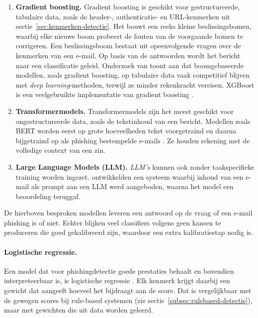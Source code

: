 \begin{enumerate}
    \item \textbf{Gradient boosting.} Gradient boosting is geschikt voor gestructureerde, tabulaire data, zoals de header-, authenticatie- en URL-ken\-merken uit sectie~\ref{sec:kenmerken-detectie}. Het bouwt een reeks kleine beslissingsbomen, waarbij elke nieuwe boom probeert de fouten van de voorgaande bomen te corrigeren. Een beslissingsboom bestaat uit opeenvolgende vragen over de kenmerken van een e-mail. Op basis van de antwoorden wordt het bericht naar een classificatie geleid. Onderzoek van \textcite{Grinsztajn2022} toont aan dat boomgebaseerde modellen, zoals gradient boosting, op tabulaire data vaak competitief blijven met \emph{deep learning}-methoden, terwijl ze minder rekenkracht vereisen. XGBoost is een veelgebruikte implementatie van gradient boosting \autocite{Chen2016}.
    \item \textbf{Transformermodels.} Transformermodels zijn het meest geschikt voor ongestructureerde data, zoals de tekstinhoud van een bericht. Modellen zoals BERT worden eerst op grote hoeveelheden tekst voorgetraind en daarna bijgetraind op als phishing bestempelde e-mails \autocite{Devlin2019}. Ze houden rekening met de volledige context van een zin.
    \item \textbf{Large Language Models (LLM).} \emph{LLM's} kunnen ook zonder taakspecifieke training worden ingezet. \textcite{Koide2025} ontwikkelden een systeem waarbij inhoud van een e-mail als prompt aan een LLM werd aangeboden, waarna het model een beoordeling teruggaf.
\end{enumerate}

De hierboven besproken modellen leveren een antwoord op de vraag of een e-mail phishing is of niet. Echter blijken veel classifiers volgens \textcite{Niculescu-Mizil2005} geen kansen te produceren die goed gekalibreerd zijn, waardoor een extra kalibratiestap nodig is.

\paragraph{Logistische regressie.}
\label{subsec:machinelearning-detectie:logistische-regressie}
Een model dat voor phishingdetectie goede prestaties behaalt en bovendien interpreteerbaar is, is logistische regressie \autocite{Alhuzali2025}. Elk kenmerk krijgt daarbij een gewicht dat aangeeft hoeveel het bijdraagt aan de score. Dat is vergelijkbaar met de gewogen scores bij rule-based systemen (zie sectie~\ref{subsec:rulebased-detectie}), maar met gewichten die uit data worden geleerd.

